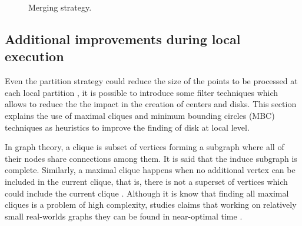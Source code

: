 \begin{itemize}
\begin{figure}[!ht]
    \centering
    \hfill
    \caption{Merging strategy.}\label{fig:merge}
\end{figure}

\subsection{Additional improvements during local execution}
Even the partition strategy could reduce the size of the points to be processed at each local partition , it is possible to introduce some filter techniques which allows to reduce the the impact in the creation of centers and disks.  This section explains the use of maximal cliques and minimum bounding circles (MBC) techniques as heuristics to improve the finding of disk at local level.

In graph theory, a clique is subset of vertices forming a subgraph where all of their nodes share connections among them.  It is said that the induce subgraph is complete.  Similarly, a maximal clique happens when no additional vertex can be included in the current clique, that is, there is not a superset of vertices which could include the current clique \cite{bron_algorithm_1973}.  Although it is know that finding all maximal cliques is a problem of high complexity, studies claims that working on relatively small real-worlds graphs they can be found in near-optimal time \cite{eppstein_listing_2010}.


\end{itemize}
